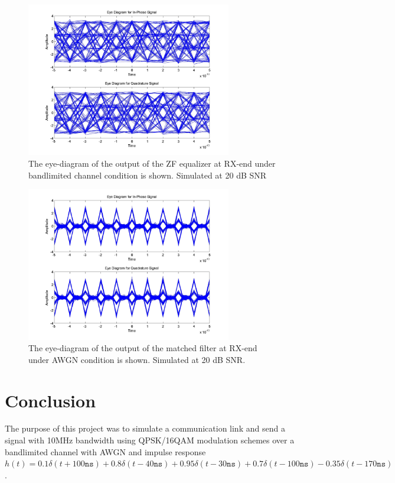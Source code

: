 \documentclass[]{article}
\begin{document}
\begin{figure}[H]
\centering
\includegraphics[width=0.8\textwidth]{equalized_eye_qam20.jpg}
\caption{The eye-diagram of the output of the ZF equalizer at RX-end under bandlimited channel condition is shown. Simulated at 20 dB SNR \label{fig:qamEyeEqu}}
\end{figure}

\begin{figure}[H]
\centering
\includegraphics[width=0.8\textwidth]{awgn_eye_qam20.jpg}
\caption{The eye-diagram of the output of the matched filter at RX-end under AWGN condition is shown. Simulated at 20 dB SNR.\label{fig:qamEyeAWGN}}
\end{figure}

\newpage
\section{Conclusion}
\label{sec:conc}
The purpose of this project was to simulate a communication link and send a signal with 10MHz bandwidth using QPSK/16QAM modulation schemes over a bandlimited channel with AWGN and impulse response  $h(t) = 0.1\delta(t + 100 \mathtt{ns}) + 0.8\delta(t -40 \mathtt{ns}) + 0.95\delta(t - 30 \mathtt{ns}) + 0.7\delta(t - 100 \mathtt{ns}) - 0.35\delta(t - 170 \mathtt{ns})$. \\
\end{document}
